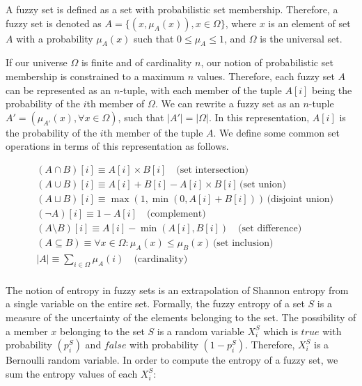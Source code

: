 \documentclass[11pt]{book}
\newcommand{\card}[1]{\left| #1 \right|}
\begin{document}
A fuzzy set is defined as a set with probabilistic set membership. Therefore, a
fuzzy set is denoted as $A = \{ (x, \mu_A(x)), x \in \Omega\}$,  where $x$ is
an element of set $A$ with a probability $\mu_A(x)$ such that $0 \leq \mu_A
\leq 1$, and $\Omega$ is the universal set.

If our universe $\Omega$ is finite and of cardinality $n$, our notion of
probabilistic set membership is constrained to a maximum $n$ values. Therefore,
each fuzzy set $A$ can be represented as an $n$-tuple, with each member of the
tuple $A[i]$ being the probability of the $i$th member of $\Omega$. We can
rewrite a fuzzy set as an $n$-tuple $A' = ( \mu_{A'}(x), \forall x \in \Omega
)$, such that $\card{A'} = \card \Omega$. In this representation, $A[i]$ is the
probability of the $i$th member of the tuple $A$. We define some common set
operations in terms of this representation as follows.

\begin{align*} &(A \cap B)[i] \equiv  A[i] \times B[i] \quad
\text{(set intersection)} \\ &(A \cup B)[i] \equiv  A[i] + B[i]  - A[i] \times
B[i] \, \text{(set union)}\\ &(A \sqcup B)[i] \equiv  \max(1, \min(0, A[i] +
B[i])) \, \text{(disjoint union)}\\ &(\lnot A)[i] \equiv 1 - A[i] \quad
\text{(complement)}\\ &(A \setminus B)[i] \equiv A[i]  - \min(A[i], B[i]) \quad
\text{(set difference)} \\ &(A \subseteq B) \equiv \forall x \in \Omega:
\mu_A(x) \leq \mu_B(x) \, \text{(set inclusion)}\\ &\card A \equiv \sum_{i \in
\Omega} \mu_A (i) \quad \text{(cardinality)} \\
\end{align*}

The notion of entropy in fuzzy sets is an extrapolation of Shannon entropy from
a single variable on the entire set. Formally, the fuzzy entropy of a set $S$
is a measure of the uncertainty of the elements belonging to the set. The
possibility of a member $x$ belonging to the set $S$ is a random variable
$X_i^S$ which is $true$ with probability $(p_i^S)$ and $false$ with probability
$(1-p^S_i)$. Therefore, $X_i^S$ is a Bernoulli random variable. In order to
compute the entropy of a fuzzy set, we sum the entropy values of each $X_i^S$:
\end{document}

